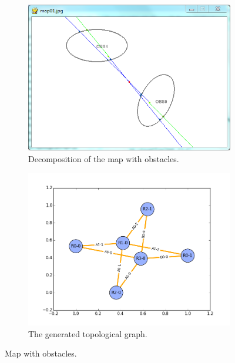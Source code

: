 \documentclass[letterpaper, 10 pt, conference]{ieeeconf}
\begin{document}
\begin{figure}
	\centering
	\begin{subfigure}[t]{0.45\linewidth}
		\centering
		\includegraphics[width=\textwidth]{fig/obs_map.png}
		\caption{Decomposition of the map with obstacles.}
		\label{fig:obs_map:map}
	\end{subfigure}  
	\begin{subfigure}[t]{0.5\linewidth}
		\centering
		\includegraphics[width=\textwidth]{fig/obs_topology.png}
		\caption{The generated topological graph.}
		\label{fig:obs_map:topology}
	\end{subfigure}   
	\caption{Map with obstacles.}
	\label{fig:obs_map}
\end{figure}
\end{document}
